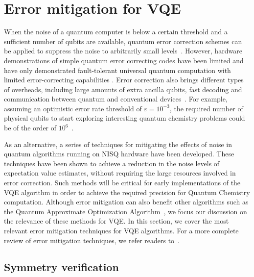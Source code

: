 \section{Error mitigation for VQE} \label{sec:error-mit}

When the noise of a quantum computer is below a certain threshold and a sufficient number of qubits are available, quantum error correction schemes can be applied to suppress the noise to arbitrarily small levels~\cite{nielsenQuantumComputationQuantum2010}. However, hardware demonstrations of simple quantum error correcting codes have been limited and have only demonstrated fault-tolerant universal quantum computation with limited error-correcting capabilities
\cite{andersenRepeatedQuantumError2020a,barendsSuperconductingQuantumCircuits2014,campagne-ibarcqQuantumErrorCorrection2020,niggQuantumComputationsTopologically2014,ofekExtendingLifetimeQuantum2016,waldherrQuantumErrorCorrection2014,Postler_2022,Krinner_2022}. Error correction also brings different types of overheads, including large amounts of extra ancilla qubits, fast decoding and communication between quantum and conventional devices~\cite{nielsenQuantumComputationQuantum2010}. For example, assuming an optimistic error rate threshold of $\varepsilon = 10^{-3}$, the required number of physical qubits to start exploring interesting quantum chemistry problems could be of the order of $10^6$~\cite{reiherElucidatingReactionMechanisms2017}.

As an alternative, a series of techniques for mitigating the effects of noise in quantum algorithms running on NISQ hardware have been developed. These techniques have been shown to achieve a reduction in the noise levels of expectation value estimates, without requiring the large resources involved in error correction. Such methods will be critical for early implementations of the VQE algorithm in order to achieve the required precision for Quantum Chemistry computation. Although error mitigation can also benefit other algorithms such as the Quantum Approximate Optimization Algorithm~\cite{Farhi2014}, we focus our discussion on the relevance of these methods for VQE. In this section, we cover the most relevant error mitigation techniques for VQE algorithms. For a more complete review of error mitigation techniques, we refer readers to~\cite{endoHybridQuantumClassicalAlgorithms2021}.


\subsection{Symmetry verification}
\label{sec:mit-symmetry-verification}

